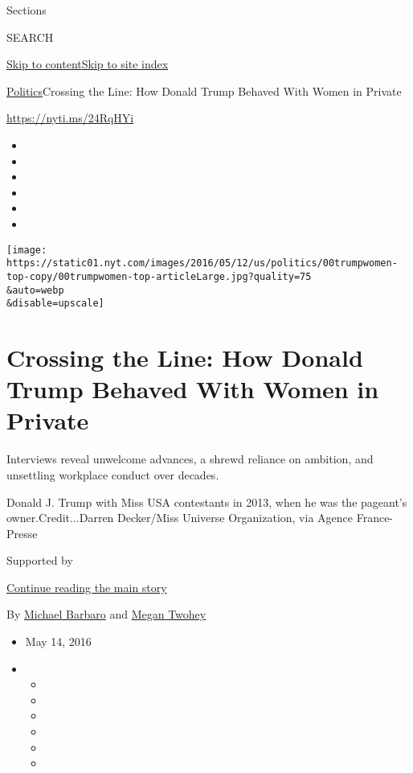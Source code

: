 Sections

SEARCH

\protect\hyperlink{site-content}{Skip to
content}\protect\hyperlink{site-index}{Skip to site index}

\href{/section/politics}{Politics}\textbar{}Crossing the Line: How
Donald Trump Behaved With Women in Private

\url{https://nyti.ms/24RqHYi}

\begin{itemize}
\item
\item
\item
\item
\item
\item
\end{itemize}

\texttt{[image: https://static01.nyt.com/images/2016/05/12/us/politics/00trumpwomen-top-copy/00trumpwomen-top-articleLarge.jpg?quality=75\\\&auto=webp\\\&disable=upscale]}

\hypertarget{crossing-the-line-how-donald-trump-behaved-with-women-in-private}{%
\section{Crossing the Line: How Donald Trump Behaved With Women in
Private}\label{crossing-the-line-how-donald-trump-behaved-with-women-in-private}}

Interviews reveal unwelcome advances, a shrewd reliance on ambition, and
unsettling workplace conduct over decades.

Donald J. Trump with Miss USA contestants in 2013, when he was the
pageant's owner.Credit...Darren Decker/Miss Universe Organization, via
Agence France-Presse

Supported by

\protect\hyperlink{after-sponsor}{Continue reading the main story}

By \href{http://www.nytimes.com/by/michael-barbaro}{Michael Barbaro} and
\href{https://www.nytimes.com/by/megan-twohey}{Megan Twohey}

\begin{itemize}
\item
  May 14, 2016
\item
  \begin{itemize}
  \item
  \item
  \item
  \item
  \item
  \item
  \end{itemize}
\end{itemize}

